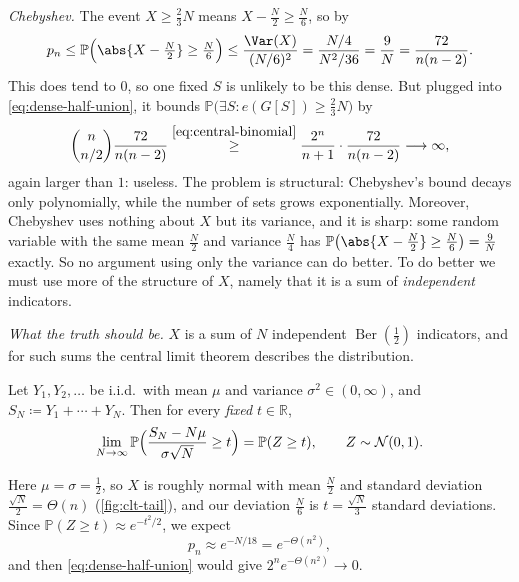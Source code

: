 \emph{Chebyshev.} The event \(X \ge \frac{2}{3} N\) means \(X - \frac{N}{2} \ge \frac{N}{6}\), so by 
\[
    p_{n}
    \le \mathbb{P}\Bigl( \abs{X - \tfrac{N}{2}} \ge \tfrac{N}{6} \Bigr)
    \le \frac{\Var(X)}{(N/6)^{2}} = \frac{N/4}{N^{2}/36} = \frac{9}{N} = \frac{72}{n(n-2)} .
\]
This does tend to \(0\), so one fixed \(S\) is unlikely to be this dense. But plugged into \eqref{eq:dense-half-union}, it bounds \(\mathbb{P}\bigl( \exists S : e(G[S]) \ge \tfrac{2}{3} N \bigr)\) by
\[
    \binom{n}{n/2} \frac{72}{n(n-2)} \overset{\eqref{eq:central-binomial}}{\ge} \frac{2^{n}}{n+1} \cdot \frac{72}{n(n-2)} \longrightarrow \infty ,
\]
again larger than \(1\): useless. The problem is structural: Chebyshev's bound decays only polynomially, while the number of sets grows exponentially. Moreover, Chebyshev uses nothing about \(X\) but its variance, and it is sharp: some random variable with the same mean \(\frac{N}{2}\) and variance \(\frac{N}{4}\) has \(\mathbb{P}\bigl( \abs{X - \frac{N}{2}} \ge \frac{N}{6} \bigr) = \frac{9}{N}\) exactly. So no argument using only the variance can do better. To do better we must use more of the structure of \(X\), namely that it is a sum of \emph{independent} indicators.

\emph{What the truth should be.} \(X\) is a sum of \(N\) independent \(\operatorname{Ber}(\frac{1}{2})\) indicators, and for such sums the central limit theorem describes the distribution.

\begin{theorem}\label{thm:clt}
    Let \(Y_{1}, Y_{2}, \ldots\) be i.i.d.\ with mean \(\mu\) and variance \(\sigma^{2} \in (0, \infty)\), and \(S_{N} \coloneqq Y_{1} + \cdots + Y_{N}\). Then for every \emph{fixed} \(t \in \mathbb{R}\),
    \[
        \lim_{N \to \infty} \mathbb{P}\Bigl( \frac{S_{N} - N\mu}{\sigma \sqrt{N}} \ge t \Bigr) = \mathbb{P}(Z \ge t), \qquad Z \sim \mathcal{N}(0, 1) .
    \]
\end{theorem}

Here \(\mu = \sigma = \frac{1}{2}\), so \(X\) is roughly normal with mean \(\frac{N}{2}\) and standard deviation \(\frac{\sqrt{N}}{2} = \Theta(n)\) (\autoref{fig:clt-tail}), and our deviation \(\frac{N}{6}\) is \(t = \frac{\sqrt{N}}{3}\) standard deviations. Since \(\mathbb{P}(Z \ge t) \approx e^{-t^{2}/2}\), we expect
\[
    p_{n} \approx e^{-N/18} = e^{-\Theta(n^{2})} ,
\]
and then \eqref{eq:dense-half-union} would give \(2^{n} e^{-\Theta(n^{2})} \to 0\).

